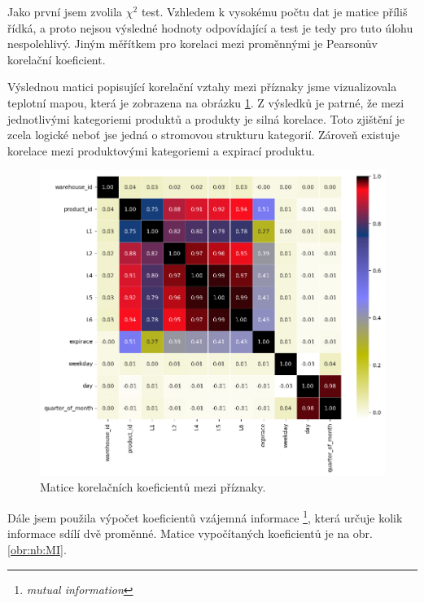 Jako první jsem zvolila $\chi^2$ test. Vzhledem k vysokému počtu dat je matice příliš řídká, a proto nejsou výsledné hodnoty odpovídající a test je tedy pro tuto úlohu nespolehlivý.
Jiným měřítkem pro korelaci mezi proměnnými je Pearsonův korelační koeficient.

Výslednou matici popisující korelační vztahy mezi příznaky jsme vizualizovala teplotní mapou, která je zobrazena na obrázku \ref*{obr:nb:pearson}. Z výsledků je patrné, že mezi jednotlivými kategoriemi produktů a produkty je silná korelace. Toto zjištění je zcela logické neboť jse jedná o stromovou strukturu kategorií. Zároveň existuje korelace mezi produktovými kategoriemi a expirací produktu. 

\begin{figure}[hbtp!]
    \centering
    \includegraphics[width=.8\textwidth]{obrazky/zntb/pearson.png}
    \caption{Matice korelačních koeficientů mezi příznaky.}
    \label{obr:nb:pearson}
\end{figure}

Dále jsem použila výpočet koeficientů vzájemná informace \footnote{\emph{mutual information}}, která určuje kolik informace sdílí dvě proměnné. %
Matice vypočítaných koeficientů je na obr.\ref*{obr:nb:MI}.

